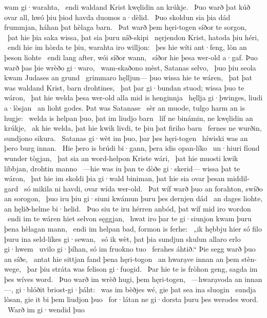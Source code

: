 wam gi·warahta, \hld\ endi waldand Krist
kwęlidin an krúkje. \hld\ Þuo warð þat kúð ovar all,
hwó þiu þiod havda duomos a·dèlid. \hld\ Þuo skoldun sia þia dád frummjan,
háhan þat hèlaga barn. \hld\ Þat warð þem hęri-togen
síðor te sorgon, \hld\ þat hie þia saka wissa,
þat sia þuru níð-skipi \hld\ nęrjendon Krist,
hatoda þiu héri, \hld\ endi hie im hòrda te þiu,
warahta iro willjon: \hld\ þes hie wíti ant·feng,
lòn an þeson liohte \hld\ endi lang after,
wói síðor wann, \hld\ síðor hie þesa wer-old a·gaf. %
Þuo warð þas þie wrèðo gi·waro, \hld\ wam-skaðono mèst,
Satanas selvo, \hld\ þuo þiu seola kwam
Judases an grund \hld\ grimmaro hęlljun—
þuo wissa hie te wáren, \hld\ þat þat was waldand Krist,
barn drohtines, \hld\ þat þar gi·bundan stuod;
wissa þuo te wáron, \hld\ þat hie welda þesa wer-old alla
mid is henginnja \hld\ hęllja gi·þwinges,
liudi a·lòsjan \hld\ an lioht godes.
Þat was Satanase \hld\ sèr an muode,
tulgo harm an is hugje: \hld\ welda is helpan þuo,
þat im liudjo barn \hld\ líf ne binámin,
ne kwęlidin an krúkje, \hld\ ak hie welda, þat hie kwik livdi,
te þiu þat firiho barn \hld\ fernes ne wurðin,
sundjono sikura. \hld\ Satanas gi·wèt im þuo,
þar þes hęri-togen \hld\ híwiski was
an þero burg innan. \hld\ Hie þero is brúdi bi·gann,
þera idis opan-líko \hld\ un·hiuri fíond
wunder tògjan, \hld\ þat sia an word-helpon
Kriste wári, \hld\ þat hie muosti kwik libbjan,
drohtin manno \hld\ —hie was iu þan te dòðe gi·skerid—
wissa þat te wáron, \hld\ þat hie im skoldi þia gi·wald biniman,
þat hie sia ovar þesan middil-gard \hld\ só mikila ni havdi,
ovar wída wer-old. \hld\ Þat wíf warð þuo an forahton,
swíðo an sorogon, \hld\ þuo iru þiu gi·siuni kwámun
þuru þes dernjen dád \hld\ an dages liohte,
an hęlið-helme bi·helid. \hld\ Þuo siu te iru hérren anbód,
þat wíf mid iro wordon \hld\ endi im te wáren hiet
selvon sęggjan, \hld\ hwat iro þar te gi·siunjon kwam
þuru þena hèlagan mann, \hld\ endi im helpan bad,
formon is ferhe: \hld\ „ik hębbju hier só filo þuru ina
seld-líkes gi·sewan, \hld\ só ik wèt, þat þia sundjun skulun
allaro erlo gi·hwem \hld\ uvilo gi·þíhan,
só im fruokno tuo \hld\ ferahes áhtið.“
Þie segg warð þuo an síðe, \hld\ antat hie sittjan fand
þena hęri-togon \hld\ an hwarạve innan
an þem stèn-wege, \hld\ þar þiu stráta was
felison gi·fuogid. \hld\ Þar hie te is fròhon geng,
sagda im þes wíves word. \hld\ Þuo warð im wrèð hugi,
þem hęri-togen, \hld\ —hwarạvoda an innan—,
gi·blóðit briost-gi·þáht: \hld\ was im bèðjes wé,
gie þat sea ina sluogin \hld\ sundja lòsan,
gie it bi þem liudjon þuo \hld\ for·látan ne gi·dorsta
þuru þes werodes word. \hld\ Warð im gi·wendid þuo
